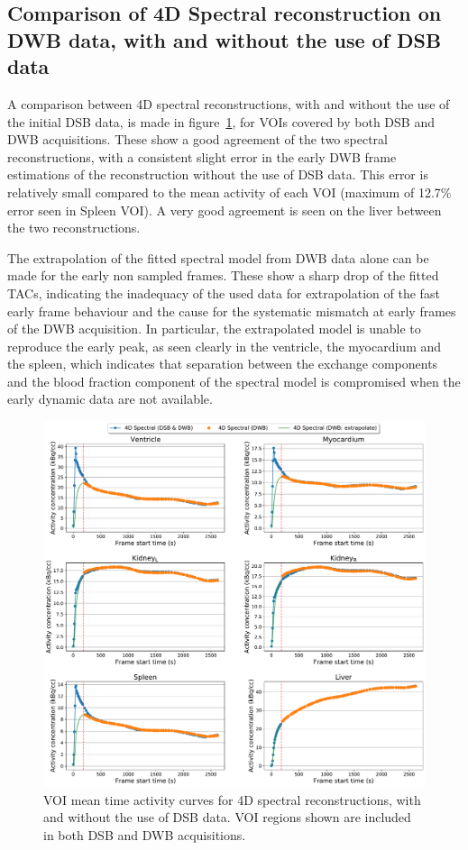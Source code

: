 \subsection{Comparison of 4D Spectral reconstruction on DWB data, with and without the use of DSB data}
A comparison between 4D spectral reconstructions, with and without the use of the initial DSB data, is made in figure~\ref{fig_3_3:IsotoPK_CTRL_DWB_4D_vs_4D_Central}, for VOIs covered by both DSB and DWB acquisitions. These show a good agreement of the two spectral reconstructions, with a consistent slight error in the early DWB frame estimations of the reconstruction without the use of DSB data. This error is relatively small compared to the mean activity of each VOI (maximum of 12.7\% error seen in Spleen VOI). A very good agreement is seen on the liver between the two reconstructions.

The extrapolation of the fitted spectral model from DWB data alone can be made for the early non sampled frames. These show a sharp drop of the fitted TACs, indicating the inadequacy of the used data for extrapolation of the fast early frame behaviour and the cause for the systematic mismatch at early frames of the DWB acquisition.
In particular, the extrapolated model is unable to reproduce the early peak, as seen clearly in the ventricle, the myocardium and the spleen, which indicates that separation between the exchange components and the blood fraction component of the spectral model is compromised when the early dynamic data are not available.

\begin{figure} [ht!]
\centering
\includegraphics[scale=0.5,angle=0]{3_Results/3_3_DWB_Reconstruction/figures/3_3_IsotoPK_CTRL_DWB_4D_vs_4D_central.pdf}
\caption{VOI mean time activity curves for 4D spectral reconstructions, with and without the use of DSB data. VOI regions shown are included in both DSB and DWB acquisitions.}
\label{fig_3_3:IsotoPK_CTRL_DWB_4D_vs_4D_Central}
\end{figure} 

